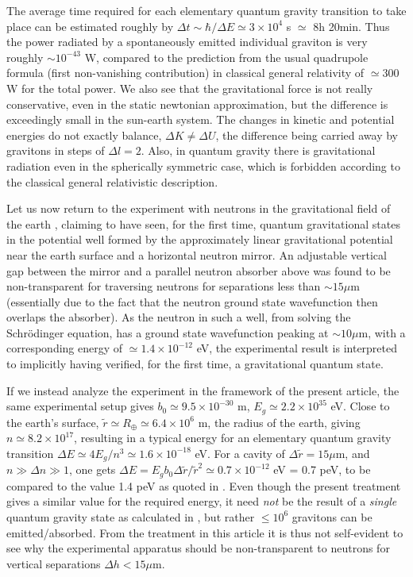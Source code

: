 	The average time required for each elementary quantum gravity
	transition to take place can be estimated roughly by $\Delta t
	\sim \hbar/\Delta E \simeq 3 \times 10^4$ s $\simeq$ 8h 20min.
	Thus the power radiated by a spontaneously emitted individual
	graviton is very roughly $\sim 10^{-43}$ W, compared to the
	prediction from the usual quadrupole formula (first non-vanishing
	contribution) in classical general relativity of $\simeq 300$ W
	for the total power. We also see that the gravitational force is
	not really conservative, even in the static newtonian
	approximation, but the difference is exceedingly small in the
	sun-earth system. The changes in kinetic and potential energies do
	not exactly balance, $\Delta K \neq \Delta U$, the difference
	being carried away by gravitons in steps of $\Delta l = 2$. Also,
	in quantum gravity there is gravitational radiation even in the
	spherically symmetric case, which is forbidden according to the
	classical general relativistic description.
	
	Let us now return to the experiment with neutrons in the
	gravitational field of the earth \cite{Nezvishevsky}, claiming to
	have seen, for the first time, quantum gravitational states in the
	potential well formed by the approximately linear gravitational
	potential near the earth surface and a horizontal neutron mirror.
	An adjustable vertical gap between the mirror and a parallel
	neutron absorber above was found to be non-transparent for
	traversing neutrons for separations less than $\sim 15 \mu$m
	(essentially due to the fact that the neutron ground state
	wavefunction then overlaps the absorber). As the neutron in such a
	well, from solving the Schr\"{o}dinger equation, has a ground
	state wavefunction peaking at $\sim 10 \mu$m, with a corresponding
	energy of $\simeq 1.4 \times 10^{-12}$ eV, the experimental result
	is interpreted to implicitly having verified, for the first time,
	a gravitational quantum state.
	
	If we instead analyze the experiment in the framework of the
	present article, the same experimental setup gives $b_0 \simeq 9.5
	\times 10^{-30}$ m, $E_g \simeq 2.2 \times 10^{35}$ eV. Close to
	the earth's surface, $\tilde{r} \simeq R_{\oplus} \simeq 6.4
	\times 10^6$ m, the radius of the earth, giving $n \simeq 8.2
	\times 10^{17}$, resulting in a typical energy for an elementary
	quantum gravity transition $\Delta E \simeq 4 E_g /n^3 \simeq 1.6
	\times 10^{-18}$ eV. For a cavity of $\Delta \tilde{r} = 15 \mu$m,
	and $n \gg \Delta n \gg 1$, one gets $\Delta E = E_g b_0 \Delta
	\tilde{r} /\tilde{r}^2 \simeq 0.7 \times 10^{-12}$ eV = 0.7 peV,
	to be compared to the value 1.4 peV as quoted in
	\cite{Nezvishevsky}. Even though the present treatment gives a
	similar value for the required energy, it need \textit{not} be the
	result of a \textit{single} quantum gravity state as calculated in
	\cite{Nezvishevsky}, but rather $\leq 10^6$ gravitons can be
	emitted/absorbed. From the treatment in this article it is thus
	not self-evident to see why the experimental apparatus
	\cite{Nezvishevsky} should be non-transparent to neutrons for
	vertical separations $\Delta h < 15 \mu$m.
	
